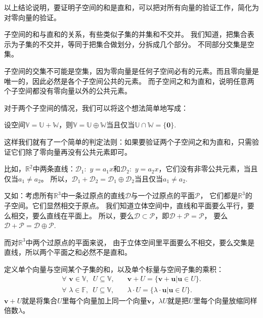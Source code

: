 \documentclass[12pt,UTF8,fontset=none]{ctexbook}
\begin{document}
以上结论说明，要证明子空间的和是直和，可以把对所有向量的验证工作，简化为对零向量的验证。

子空间的和与直和的关系，有些类似子集的并集和不交并。
我们知道，把集合表示为子集的不交并，等同于把集合做划分，分拆成几个部分。
不同部分交集是空集。

子空间的交集不可能是空集，因为零向量是任何子空间必有的元素。而且零向量是唯一的，因此必然是各个子空间公共的元素。
而子空间之和为直和，说明任意两个子空间都没有零向量以外的公共元素。

对于两个子空间的情况，我们可以将这个想法简单地写成：
\begin{pp}\label{pp:1_9}
    设空间$\mathbb{V} = \mathbb{U} + \mathbb{W} $，则$\mathbb{V} = \mathbb{U} \oplus \mathbb{W}$当且仅当$\mathbb{U} \cap \mathbb{W} = \{\mathbf{0}\}$.
\end{pp}

这样我们就有了一个简单的判定法则：如果要验证两个子空间之和为直和，只需验证它们除了零向量再没有公共元素即可。

比如，$\mathbb{R}^2$中两条直线：$\mathcal{D}_1:\,\,y = a_1x$和$\mathcal{D}_2:\,\,y = a_2x$，它们没有非零公共元素，当且仅当$a_1 \neq a_2$。
所以，$\mathcal{D}_1+\mathcal{D}_2 = \mathcal{D}_1\oplus\mathcal{D}_2$当且仅当$a_1 \neq a_2$.

又如：考虑所有$\mathbb{R}^3$中一条过原点的直线$\mathcal{D}$与一个过原点的平面$\mathcal{P}$，
它们都是$\mathbb{R}^3$的子空间。它们显然相交于原点。
我们知道立体空间中，直线和平面要么平行，要么相交，要么直线在平面上。
所以，要么$\mathcal{D} \subset \mathcal{P}$，即$\mathcal{D} + \mathcal{P} = \mathcal{P}$，
要么$\mathcal{D} + \mathcal{P} = \mathcal{D} \oplus\mathcal{P}$.

而对$\mathbb{R}^3$中两个过原点的平面来说，
由于立体空间里平面要么不相交，要么交集是直线，所以两个平面之和必然不是直和。


定义单个向量与空间某个子集的和，以及单个标量与空间子集的乘积：
\begin{align*}\forall \,\,\mathbf{v} \in \mathbb{V}, \,\,\,U \subseteq \mathbb{V}, & \quad \mathbf{v} + U = \{\mathbf{v} + \mathbf{u} | \mathbf{u} \in U\}. \\
\forall \,\,\lambda \in \mathbb{F}, \,\,\,U \subseteq \mathbb{V}, & \quad \lambda \cdot U = \{\lambda \cdot \mathbf{u} | \mathbf{u} \in U\}.
\end{align*}
$\mathbf{v} + U$就是将集合$U$里每个向量加上同一个向量$\mathbf{v}$，$\lambda U$就是把$U$里每个向量放缩同样倍数$\lambda$。
\end{document}
